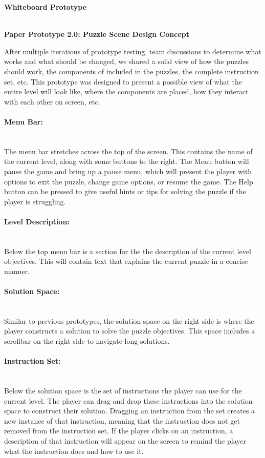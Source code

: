 \textbf{Whiteboard Prototype}



~\\


\textbf{Paper Prototype 2.0: Puzzle Scene Design Concept}

After multiple iterations of prototype testing, team discussions to determine what works and what should be changed, we shared a solid view of how the puzzles should work, the components of included in the puzzles, the complete instruction set, etc.
This prototype was designed to present a possible view of what the entire level will look like, where the components are placed, how they interact with each other on screen, etc.




\paragraph{Menu Bar:} ~\\
The menu bar stretches across the top of the screen. This contains the name of the current level, along with some buttons to the right.
The Menu button will pause the game and bring up a pause menu, which will present the player with options to exit the puzzle, change game options, or resume the game.
The Help button can be pressed to give useful hints or tips for solving the puzzle if the player is struggling.


\paragraph{Level Description:} ~\\
Below the top menu bar is a section for the the description of the current level objectives. This will contain text that explains the current puzzle in a concise manner.


\paragraph{Solution Space:} ~\\
Similar to previous prototypes, the solution space on the right side is where the player constructs a solution to solve the puzzle objectives. This space includes a scrollbar on the right side to navigate long solutions.


\paragraph{Instruction Set:} ~\\
Below the solution space is the set of instructions the player can use for the current level.
The player can drag and drop these instructions into the solution space to construct their solution.
Dragging an instruction from the set creates a new instance of that instruction, meaning that the instruction does not get removed from the instruction set.
If the player clicks on an instruction, a description of that instruction will appear on the screen to remind the player what the instruction does and how to use it.


